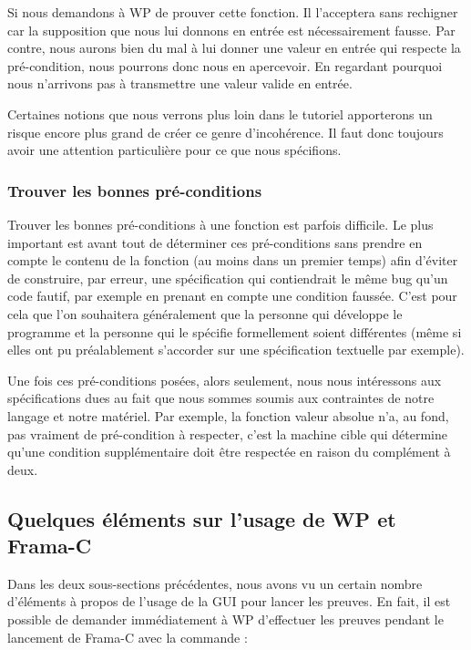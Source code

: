 \documentclass[12pt,francais,]{scrbook}
\begin{document}
Si nous demandons à WP de prouver cette fonction. Il l'acceptera sans
rechigner car la supposition que nous lui donnons en entrée est
nécessairement fausse. Par contre, nous aurons bien du mal à lui donner
une valeur en entrée qui respecte la pré-condition, nous pourrons donc
nous en apercevoir. En regardant pourquoi nous n'arrivons pas à
transmettre une valeur valide en entrée.

Certaines notions que nous verrons plus loin dans le tutoriel
apporterons un risque encore plus grand de créer ce genre d'incohérence.
Il faut donc toujours avoir une attention particulière pour ce que nous
spécifions.

\subsubsection{Trouver les bonnes
pré-conditions}\label{trouver-les-bonnes-pruxe9-conditions}

Trouver les bonnes pré-conditions à une fonction est parfois difficile.
Le plus important est avant tout de déterminer ces pré-conditions sans
prendre en compte le contenu de la fonction (au moins dans un premier
temps) afin d'éviter de construire, par erreur, une spécification qui
contiendrait le même bug qu'un code fautif, par exemple en prenant en
compte une condition faussée. C'est pour cela que l'on souhaitera
généralement que la personne qui développe le programme et la personne
qui le spécifie formellement soient différentes (même si elles ont pu
préalablement s'accorder sur une spécification textuelle par exemple).

Une fois ces pré-conditions posées, alors seulement, nous nous
intéressons aux spécifications dues au fait que nous sommes soumis aux
contraintes de notre langage et notre matériel. Par exemple, la fonction
valeur absolue n'a, au fond, pas vraiment de pré-condition à respecter,
c'est la machine cible qui détermine qu'une condition supplémentaire
doit être respectée en raison du complément à deux.

\subsection{Quelques éléments sur l'usage de WP et
Frama-C}\label{quelques-uxe9luxe9ments-sur-lusage-de-wp-et-frama-c}

Dans les deux sous-sections précédentes, nous avons vu un certain nombre
d'éléments à propos de l'usage de la GUI pour lancer les preuves. En
fait, il est possible de demander immédiatement à WP d'effectuer les
preuves pendant le lancement de Frama-C avec la commande :
\end{document}
